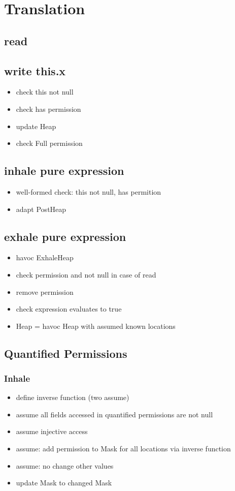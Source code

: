 \documentclass[12pt]{article}
\begin{document}
\section{Translation}
\subsection{read}

\subsection{write this.x}
\begin{itemize}
\item check this not null
\item check has permission
\item update Heap
\item check Full permission
\end{itemize}

\subsection{inhale pure expression}
\begin{itemize}
\item well-formed check: this not null, has permition
\item adapt PostHeap
\end{itemize}

\subsection{exhale pure expression}
\begin{itemize}
\item havoc ExhaleHeap
\item check permission and not null in case of read
\item remove permission
\item check expression evaluates to true
\item Heap = havoc Heap with assumed known locations
\end{itemize}

\subsection{Quantified Permissions}
\subsubsection{Inhale}
\begin{itemize}
\item define inverse function (two assume)
\item assume all fields accessed in quantified permissions are not null
\item assume injective access
\item assume: add permission to Mask for all locations via inverse function
\item assume: no change other values
\item update Mask to changed Mask
\end{itemize}
\end{document}

